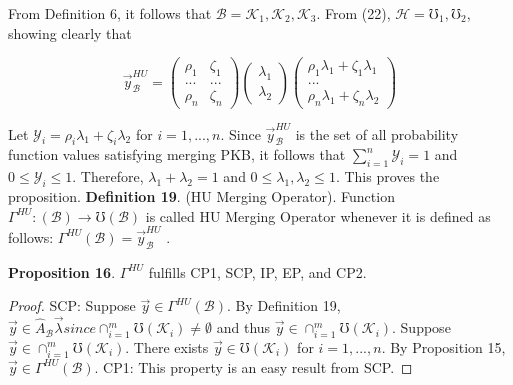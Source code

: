 \documentclass[]{iosart2c}
\begin{document}
    From Definition 6, it follows that $\mathcal{B} = {\mathcal{K}_1,
    \mathcal{K}_2,\mathcal{K}_3}$. From (22), $\mathcal{H} = {\mho_1,\mho_2}$, showing clearly
    that

    $$
    \vec{y}^{HU}_\mathcal{B} =
    \left( \begin{array}{cc}
               \rho_1 & \zeta_1 \\
               ...    & ...     \\
               \rho_n & \zeta_n
    \end{array} \right)
%
    \left( \begin{array}{cc}
               \lambda_1 \\
               \lambda_2
    \end{array}
    \right)
    \left( \begin{array}{cc}
               \rho_1\lambda_1 + \zeta_1\lambda_1 \\
               ...                                \\
               \rho_n\lambda_1 + \zeta_n\lambda_2
    \end{array} \right)
    $$

    Let $\mathcal{Y}_i = \rho_i\lambda_1 + \zeta_i\lambda_2$ for $i = 1, ... , n$. Since $\vec{y}^{HU}_\mathcal{B}$
    is the set of all probability function values satisfying
    merging PKB, it follows that $\sum^n_{i=1} \mathcal{Y}_i = 1$ and $0 \le
    \mathcal{Y}_i \le 1$. Therefore, $\lambda_1 + \lambda_2 = 1$ and $0 \le \lambda_1, \lambda_2 \le 1$.
    This proves the proposition.
    \textbf{Definition 19}. (HU Merging Operator). Function
    $\Gamma^{HU} : (\mathcal{B}) \to \mho(\mathcal{B})$ is called HU Merging Operator
    whenever it is defined as follows: $\Gamma^{HU}(\mathcal{B}) = \vec{y}^{HU}_\mathcal{B}$ .

    \textbf{Proposition 16}. $\Gamma^{HU}$ fulfills CP1, SCP, IP, EP, and CP2.

    \begin{proof}
        SCP: Suppose $\vec{y}  \in \Gamma^{HU}(\mathcal{B})$. By Definition
        19, $\vec{y} \in \widehat{A}_\mathcal{B}\vec{\lambda} since \cap^m_{i=1}\mho(\mathcal{K}_i) \neq \emptyset$ and thus $\vec{y} \in
        \cap^m_{i=1}\mho(\mathcal{K}_i)$. Suppose $\vec{y} \in \cap^m_{i=1}\mho(\mathcal{K}_i)$. There exists
        $\vec{y} \in \mho(\mathcal{K}_i)$ for $i = 1, ... , n$. By Proposition 15, $\vec{y} \in
        \Gamma^{HU}(\mathcal{B})$. CP1: This property is an easy result from
        SCP.
    \end{proof}
\end{document}

